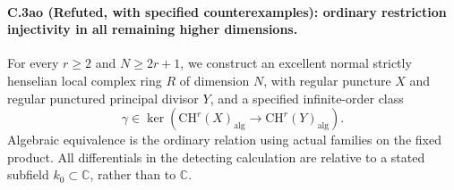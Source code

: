 \paragraph{C.3ao (Refuted, with specified counterexamples): ordinary restriction injectivity in all remaining higher dimensions.}
For every $r\ge2$ and $N\ge2r+1$, we construct an excellent
normal strictly henselian local complex ring $R$ of dimension
$N$, with regular puncture $X$ and regular punctured principal
divisor $Y$, and a specified infinite-order class
\[
 \gamma\in\ker\!\left(
 \mathrm{CH}^r(X)_{\mathrm{alg}}
       \longrightarrow\mathrm{CH}^r(Y)_{\mathrm{alg}}\right).
\]
Algebraic equivalence is the ordinary relation using actual
families on the fixed product. All differentials in the
detecting calculation are relative to a stated subfield
$k_0\subset\mathbb C$, rather than to $\mathbb C$.

